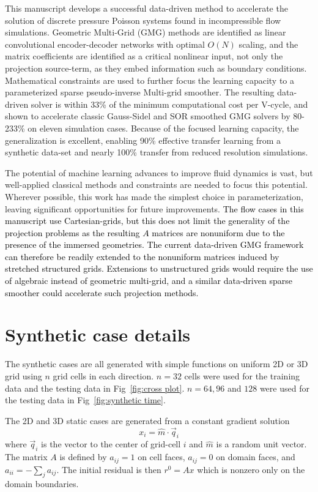 \documentclass[]{elsarticle}
\begin{document}
This manuscript develops a successful data-driven method to accelerate the solution of discrete pressure Poisson systems found in incompressible flow simulations. Geometric Multi-Grid (GMG) methods are identified as linear convolutional encoder-decoder networks with optimal $O(N)$ scaling, and the matrix coefficients are identified as a critical nonlinear input, not only the projection source-term, as they embed information such as boundary conditions. Mathematical constraints are used to further focus the learning capacity to a parameterized sparse pseudo-inverse Multi-grid smoother. The resulting data-driven solver is within 33\% of the minimum computational cost per V-cycle, and shown to accelerate classic Gauss-Sidel and SOR smoothed GMG solvers by 80-233\% on eleven simulation cases. Because of the focused learning capacity, the generalization is excellent, enabling 90\% effective transfer learning from a synthetic data-set and nearly 100\% transfer from reduced resolution simulations.

The potential of machine learning advances to improve fluid dynamics is vast, but well-applied classical methods and constraints are needed to focus this potential. Wherever possible, this work has made the simplest choice in parameterization, leaving significant opportunities for future improvements. \textcolor{black}{The flow cases in this manuscript use Cartesian-grids, but this does not limit the generality of the projection problems as the resulting $A$ matrices are nonuniform due to the presence of the immersed geometries. The current data-driven GMG framework can therefore be readily extended to the nonuniform matrices induced by stretched structured grids. Extensions to unstructured grids would require the use of algebraic instead of geometric multi-grid, and a similar data-driven sparse smoother could accelerate such projection methods.}


\color{black}
\appendix
\section{Synthetic case details}\label{app synth}

The synthetic cases are all generated with simple functions on uniform 2D or 3D grid using $n$ grid cells in each direction. $n=32$ cells were used for the training data and the testing data in Fig~\ref{fig:cross plot}. $n=64,96$ and $128$ were used for the testing data in Fig~\ref{fig:synthetic time}.

The 2D and 3D static cases are generated from a constant gradient solution
$$ x_i = \hat m \cdot \vec q_i$$
where $\vec q_i$ is the vector to the center of grid-cell $i$ and $\hat m$ is a random unit vector. The matrix $A$ is defined by $a_{ij}=1$ on cell faces, $a_{ij}=0$ on domain faces, and $a_{ii}=-\sum_j a_{ij}$. The initial residual is then $r^0=A x$ which is nonzero only on the domain boundaries.
\end{document}
